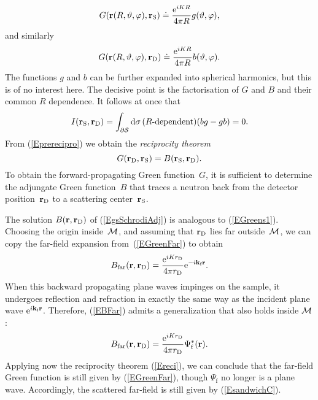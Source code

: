 \begin{equation}
   G(\mathbf{r}(R,\vartheta,\varphi),\mathbf{r}_\text{S})
   \doteq \frac{{\rm e}^{iKR}}{4\pi R} g(\vartheta,\varphi),
\end{equation}
and similarly 
\begin{equation}
   G(\mathbf{r}(R,\vartheta,\varphi),\mathbf{r}_\text{D})
   \doteq \frac{{\rm e}^{iKR}}{4\pi R} b(\vartheta,\varphi).
\end{equation}
The functions $g$ and $b$ can be further expanded into spherical harmonics,
but this is of no interest here.
The decisive point is the factorisation of $G$ and $B$
and their common $R$ dependence.
It follows at once that
\begin{equation}
  I(\mathbf{r}_\text{S},\mathbf{r}_\text{D})
  =\displaystyle\int_{\partial\mathcal{S}}{\rm d}\sigma\,
       (\text{$R$-dependent})(bg-gb)
  = 0.
\end{equation}
From (\ref{Eprerecipro}) we obtain the \textit{reciprocity theorem}
\begin{equation}\label{Ereci}
  G(\mathbf{r}_\text{D},\mathbf{r}_\text{S}) = B(\mathbf{r}_\text{S},\mathbf{r}_\text{D}).
\end{equation}
To obtain the forward-propagating Green function~$G$,
it is sufficient to determine the adjungate Green function~$B$
that traces a neutron back from the detector position~$\mathbf{r}_\text{D}$
to a scattering center~$\mathbf{r}_\text{S}$.

The solution $B(\mathbf{r},\mathbf{r}_\text{D})$ of (\ref{EgsSchrodiAdj})
is analogous to (\ref{EGreens1}).
Choosing the origin inside~$\mathcal{M}$, 
and assuming that $\mathbf{r}_\text{D}$ lies far outside~$\mathcal{M}$,
we can copy the far-field expansion from~(\ref{EGreenFar})
to obtain
\begin{equation}\label{EBFar}
  B_\text{far}(\mathbf{r},\mathbf{r}_\text{D})
  =\frac{{\rm e}^{iKr_\text{D}}}{4\pi r_\text{D}}{\rm e}^{-i\mathbf{k}_\text{f} \mathbf{r}}.
\end{equation}
When this backward propagating plane waves impinges on the sample,
it undergoes reflection and refraction in exactly the same way as
the incident plane wave ${\rm e}^{i\mathbf{k}_\text{i}\mathbf{r}}$.
Therefore,
 (\ref{EBFar}) admits a generalization that also holds inside $\mathcal{M}$:
\begin{equation}\label{EBFull}
  B_\text{far}(\mathbf{r},\mathbf{r}_\text{D})
  = \frac{{\rm e}^{iKr_\text{D}}}{4\pi r_\text{D}}\Psi^*_\text{f}(\mathbf{r}).
\end{equation}
Applying now the reciprocity theorem (\ref{Ereci}),
we can conclude that the far-field Green function
is still given by (\ref{EGreenFar}),
though $\Psi_\text{f}$ no longer is a plane wave.
Accordingly,
the scattered far-field is still given by (\ref{EsandwichC}).


